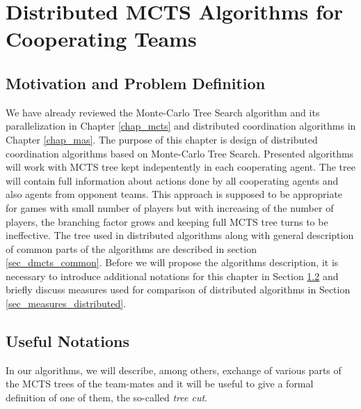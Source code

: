 \chapter{Distributed MCTS Algorithms for Cooperating Teams}
\label{chap_dmcts_design}

\section{Motivation and Problem Definition}


We have already reviewed the Monte-Carlo Tree Search algorithm and its parallelization in
 Chapter \ref{chap_mcts} and distributed coordination algorithms in Chapter \ref{chap_mas}.
 The purpose of this chapter is design of distributed coordination algorithms based on
 Monte-Carlo Tree Search. Presented algorithms will work with MCTS tree kept indepentently in
 each cooperating agent. The tree will contain full information about actions done by all
 cooperating agents and also agents from opponent teams. This approach is supposed to be
 appropriate for games with small number of players but with increasing of the number of
 players, the branching factor grows and keeping full MCTS tree turns to be ineffective. The
 tree used in distributed algorithms along with general description of common parts of the
 algorithms are described in section \ref{sec_dmcts_common}. Before we will propose the
 algorithms description, it is necessary to introduce additional notations for this chapter in
 Section \ref{sec_notations_dmcts} and briefly discuss measures used for comparison of
 distributed algorithms in Section \ref{sec_measures_distributed}. 

\section{Useful Notations}
\label{sec_notations_dmcts}

In our algorithms, we will describe, among others, exchange of various parts of the MCTS trees of
the team-mates and it will be useful to give a formal definition of one of them, the so-called
\emph{tree cut}.

